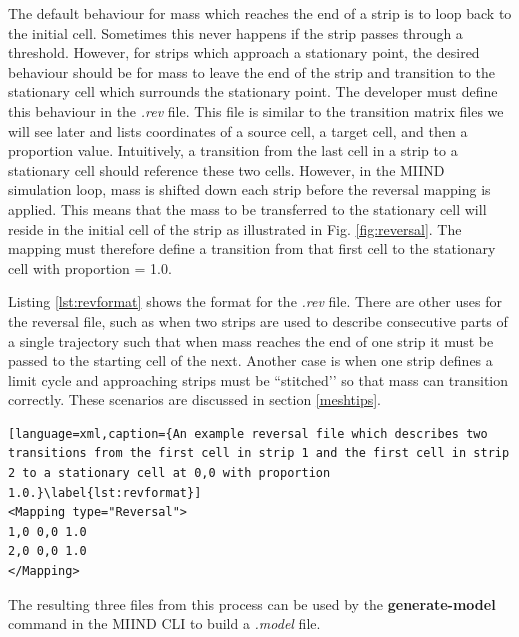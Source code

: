 \documentclass[utf8]{frontiers_suppmat} %
\begin{document}
The default behaviour for mass which reaches the end of a strip is to loop back to the initial cell. Sometimes this never happens if the strip passes through a threshold. However, for strips which approach a stationary point, the desired behaviour should be for mass to leave the end of the strip and transition to the stationary cell which surrounds the stationary point. The developer must define this behaviour in the \textit{.rev} file. This file is similar to the transition matrix files we will see later and lists coordinates of a source cell, a target cell, and then a proportion value. Intuitively, a transition from the last cell in a strip to a stationary cell should reference these two cells. However, in the MIIND simulation loop, mass is shifted down each strip before the reversal mapping is applied. This means that the mass to be transferred to the stationary cell will reside in the initial cell of the strip as illustrated in Fig. \ref{fig:reversal}. The mapping must therefore define a transition from that first cell to the stationary cell with proportion = 1.0.

Listing \ref{lst:revformat} shows the format for the \textit{.rev} file. There are other uses for the reversal file, such as when two strips are used to describe consecutive parts of a single trajectory such that when mass reaches the end of one strip it must be passed to the starting cell of the next. Another case is when one strip defines a limit cycle and approaching strips must be ``stitched’’ so that mass can transition correctly. These scenarios are discussed in section \ref{meshtips}.

\begin{lstlisting}[language=xml,caption={An example reversal file which describes two transitions from the first cell in strip 1 and the first cell in strip 2 to a stationary cell at 0,0 with proportion 1.0.}\label{lst:revformat}]
<Mapping type="Reversal">
1,0	0,0	1.0
2,0	0,0	1.0
</Mapping>
\end{lstlisting}

The resulting three files from this process can be used by the \textbf{generate-model} command in the MIIND CLI to build a \textit{.model} file.
\end{document}

